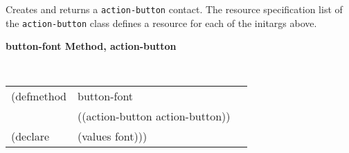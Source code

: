 \begin{flushright} \parbox[t]{6.125in}{
Creates and returns a {\tt action-button} contact.
The resource specification list of the {\tt action-button} class defines
a resource for each of the initargs above.


}\end{flushright}


%
%
%



{\samepage  
{\large {\bf button-font \hfill Method, action-button}}
\begin{flushright} \parbox[t]{6.125in}{
\tt
\begin{tabular}{lll}
\raggedright
(defmethod & button-font & \\
& ((action-button  action-button)) \\
(declare & (values font)))
\end{tabular}
\rm

}\end{flushright}}

